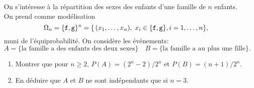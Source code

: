 \documentclass[a4paper,12pt,reqno]{amsart}
\begin{document}
\begin{exo}

  On s'intéresse à la répartition des sexes des enfants d'une famille de
  $n$ enfants. On prend comme modélisation
    $$
      \Omega_n=\{{\tt f},{\tt g}\}^n=\{\,(x_1,\ldots,x_n),\; x_i\in\{{\tt f},{\tt g}\}, i=1,\dots,n\},
    $$
  muni de l'équiprobabilité. On considère les événements:
    $$
      A=\{\text{la famille a des enfants des deux sexes}\}\quad
      B=\{\text{la famille a au plus une fille}\}.
    $$

  \begin{enumerate}
    \item  Montrer que pour $n\geq 2$, $P(A)=(2^n-2)/2^n$ et $P(B)=(n+1)/2^n$.
    \item  En déduire que $A$ et $B$ ne sont indépendants que si $n=3$.
  \end{enumerate}

 \end{exo}
\end{document}
